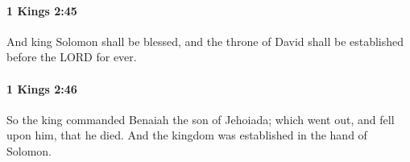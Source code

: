 		\paragraph{1 Kings 2:45} %
			\label{1KINGS-2-45}

			And king Solomon shall be blessed, and the throne of David shall be established before the LORD for ever.


		\paragraph{1 Kings 2:46} %
			\label{1KINGS-2-46}

			So the king commanded Benaiah the son of Jehoiada; which went out, and fell upon him, that he died. And the kingdom was established in the hand of Solomon.

